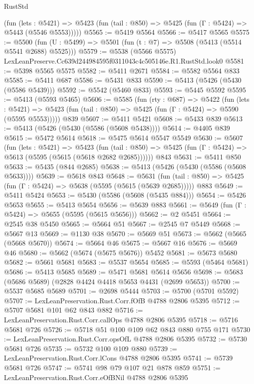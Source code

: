 \begin{lexlean}{RustStd}
\begin{coremodule}
      (fun (lets : @5421) =>
      @5423 (fun (tail : @850) => @5425 (fun (Γ : @5424) => @5443 (@5546 @5553)))))
@5565 := @5419 @5564
@5566 := @5417 @5565
@5575 := @5500 (fun (U : @5499) => @5501 (fun (t : @7) => @5508 (@5413 (@5514 @5541 @2688) @5525)))
@5579 := @5538 (@5566 @5575) LexLeanPreserve.Cc639d244984595f0311043c4c505146e.R1.RustStd.look0
@5581 := @5398 @5565 @5575
@5582 := @5411 @2671
@5584 := @5582 @5564 @833
@5585 := @5411 @687
@5586 := @5431 @833
@5590 := @5413 (@5426 (@5430 (@5586 @5439)))
@5592 := @5542 (@5460 @833)
@5593 := @5445 @5592
@5595 := @5413 (@5593 @5465)
@5606 := @5585
    (fun (rty : @687) =>
    @5422
      (fun (lets : @5421) =>
      @5423 (fun (tail : @850) => @5425 (fun (Γ : @5424) => @5590 (@5595 @5553)))))
    @839
@5607 := @5411 @5421
@5608 := @5433 @839
@5613 := @5413 (@5426 (@5430 (@5586 (@5608 @5438))))
@5614 := @4405 @839
@5615 := @5472 @5614
@5618 := @5475 @5614 @5547 @5549
@5630 := @5607
    (fun (lets : @5421) =>
    @5423
      (fun (tail : @850) => @5425 (fun (Γ : @5424) => @5613 (@5595 (@5615 (@5618 @2682 @2685))))))
    @843
@5631 := @5411 @850
@5633 := @5435 (@844 @2685)
@5638 := @5413 (@5426 (@5430 (@5586 (@5608 @5633))))
@5639 := @5618 @843
@5648 := @5631
    (fun (tail : @850) => @5425 (fun (Γ : @5424) => @5638 (@5595 (@5615 (@5639 @2685)))))
    @883
@5649 := @5411 @5424
@5653 := @5430 (@5586 (@5608 (@5435 @884)))
@5654 := @5426 @5653
@5655 := @5413 @5654
@5656 := @5639 @883
@5661 := @5649 (fun (Γ : @5424) => @5655 (@5595 (@5615 @5656)))
@5662 := @2 @5451
@5664 := @2545 @38 @5450
@5665 := @5664 @51
@5667 := @2545 @7 @5449
@5668 := @5667 @13
@5669 := @1130 @38
@5670 := @5669 @51
@5673 := @5662 (@5665 (@5668 @5670))
@5674 := @5664 @46
@5675 := @5667 @16
@5676 := @5669 @46
@5680 := @5662 (@5674 (@5675 @5676)) @5452
@5681 := @5673 @5680
@5682 := @5661 @5681
@5683 := @5537 @5654
@5685 := @5593 (@5464 @5681)
@5686 := @5413 @5685
@5689 := @5471 @5681 @5614 @5656
@5698 := @5683 (@5686 @5689) (@2828 @4424 @4418 @5653 @4431 (@2699 @5653))
@5700 := @5537 @5685 @5689
@5701 := @2698 @5444
@5703 := @5700 (@5701 @5592)
@5707 := LexLeanPreservation.Rust.Corr.fOfB @4788 @2806 @5395
@5712 := @5707 @5681 @101 @62 @843 @882
@5716 := LexLeanPreservation.Rust.Corr.callOps @4788 @2806 @5395
@5718 := @5716 @5681 @726
@5726 := @5718 @51 @100 @109 @62 @843 @880 @755 @171
@5730 := LexLeanPreservation.Rust.Corr.opsOfL @4788 @2806 @5395
@5732 := @5730 @5681 @726
@5735 := @5732 @100 @109 @880
@5739 := LexLeanPreservation.Rust.Corr.lCons @4788 @2806 @5395
@5741 := @5739 @5681 @726
@5747 := @5741 @98 @79 @107 @21 @878 @859
@5751 := LexLeanPreservation.Rust.Corr.eOfBNil @4788 @2806 @5395

\end{coremodule}
\end{lexlean}
